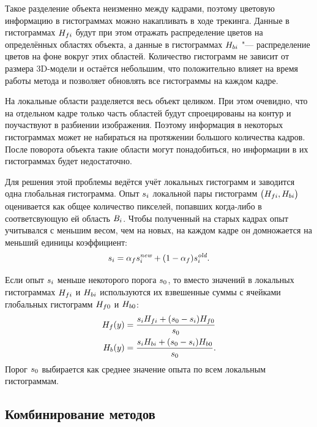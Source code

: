 Такое разделение объекта неизменно между кадрами, поэтому цветовую информацию
в гистограммах можно накапливать в ходе трекинга.
Данные в гистограммах $H_{fi}$ будут при этом отражать распределение
цветов на определённых областях объекта, а данные в гистограммах
$H_{bi}$ "--- распределение цветов на фоне вокруг этих областей.
Количество гистограмм не зависит от размера 3D-модели и остаётся небольшим, что
положительно влияет на время работы метода и позволяет обновлять все
гистограммы на каждом кадре.

На локальные области разделяется весь объект целиком.
При этом очевидно, что на отдельном кадре только часть областей будут
спроецированы на контур и поучаствуют в разбиении изображения.
Поэтому информация в некоторых гистограммах может не набираться на протяжении
большого количества кадров.
После поворота объекта такие области могут понадобиться, но информации в
их гистограммах будет недостаточно.

Для решения этой проблемы ведётся учёт  локальных гистограмм и
заводится одна глобальная гистограмма.
Опыт $s_{i}$ локальной пары гистограмм
$\left( H_{fi}, H_{bi} \right)$
оценивается как общее количество пикселей, попавших
когда-либо в соответсвующую ей область $B_{i}$.
Чтобы полученный на старых кадрах опыт учитывался с меньшим весом, чем на
новых, на каждом кадре он домножается на меньший единицы коэффициент:
\begin{equation}
    s_{i} = \alpha_{f} s_{i}^{\text{\it new}} + (1 - \alpha_{f}) s_{i}^{\text{\it old}}
\text{.}
\end{equation}

Если опыт $s_{i}$ меньше некоторого порога $s_{0}$,
то вместо значений в локальных гистограммах
$H_{fi}$ и $H_{bi}$
используются их взвешенные суммы с ячейками глобальных гистограмм
$H_{f0}$ и $H_{b0}$:
\begin{align}\label{eqn:histo_skill}
    H_{f}(y) &= \dfrac{s_{i} H_{fi} + (s_{0} - s_{i}) H_{f0}}{s_{0}} \\
    H_{b}(y) &= \dfrac{s_{i} H_{bi} + (s_{0} - s_{i}) H_{b0}}{s_{0}}
\text{.}
\end{align}
Порог $s_{0}$ выбирается как среднее значение опыта по всем локальным
гистограммам.

\subsection{Комбинирование методов}\label{combining}

